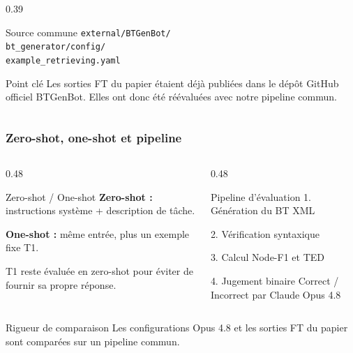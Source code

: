 \documentclass[aspectratio=169]{beamer}
\begin{document}
\begin{frame}
\begin{columns}[T]
\begin{column}{0.39\textwidth}
\begin{exampleblock}{Source commune}
        \vspace{0.3em}
        \texttt{external/BTGenBot/}\\
        \texttt{bt\_generator/config/}\\
        \texttt{example\_retrieving.yaml}
      \end{exampleblock}

      \begin{alertblock}{Point clé}
        \small
        Les sorties FT du papier étaient déjà publiées dans le dépôt GitHub officiel BTGenBot. Elles ont donc été réévaluées avec notre pipeline commun.
      \end{alertblock}
    \end{column}
  \end{columns}
\end{frame}

\begin{frame}
  \frametitle{Zero-shot, one-shot et pipeline}

  \begin{columns}[T]
    \begin{column}{0.48\textwidth}
      \begin{block}{Zero-shot / One-shot}
        \small
        \textbf{Zero-shot :} instructions système + description de tâche.

        \vspace{0.3em}
        \textbf{One-shot :} même entrée, plus un exemple fixe T1.

        \vspace{0.3em}
        T1 reste évaluée en zero-shot pour éviter de fournir sa propre réponse.
      \end{block}
    \end{column}
    \begin{column}{0.48\textwidth}
      \begin{block}{Pipeline d'évaluation}
        \small
        1. Génération du BT XML

        2. Vérification syntaxique

        3. Calcul Node-F1 et TED

        4. Jugement binaire \og Correct / Incorrect \fg{} par Claude Opus 4.8
      \end{block}
    \end{column}
  \end{columns}

  \vspace{0.4em}
  \begin{exampleblock}{Rigueur de comparaison}
    \small
    Les configurations Opus 4.8 et les sorties FT du papier sont comparées sur un pipeline commun.
  \end{exampleblock}
\end{frame}
\end{document}
